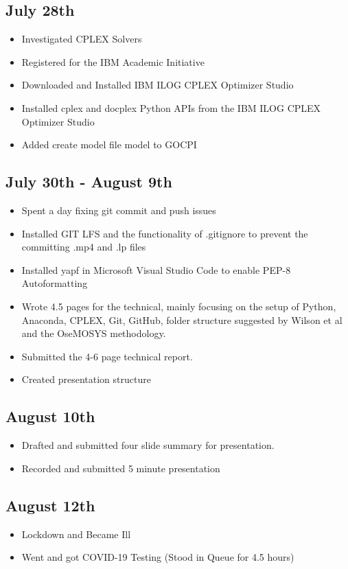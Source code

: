 \documentclass[12pt]{article}
\begin{document}
\subsection*{July 28th}
\begin{itemize}
	\item Investigated CPLEX Solvers
	\item Registered for the IBM Academic Initiative
	\item Downloaded and Installed IBM ILOG CPLEX Optimizer Studio
	\item Installed cplex and docplex Python APIs from the IBM ILOG CPLEX Optimizer Studio
	\item Added create model file model to GOCPI
\end{itemize}
\subsection*{July 30th - August 9th}
\begin{itemize}
	\item Spent a day fixing git commit and push issues
	\item Installed GIT LFS and the functionality of .gitignore to prevent the committing .mp4 and .lp files
	\item Installed yapf in Microsoft Visual Studio Code to enable PEP-8 Autoformatting
	\item Wrote 4.5 pages for the technical, mainly focusing on the setup of Python, Anaconda, CPLEX, Git, GitHub, folder structure suggested by Wilson et al and the OseMOSYS methodology.
	\item Submitted the 4-6 page technical report.
	\item Created presentation structure 
\end{itemize}
\subsection*{August 10th}
\begin{itemize}
	\item Drafted and submitted four slide summary for presentation.
	\item Recorded and submitted 5 minute presentation
\end{itemize}
\subsection*{August 12th}
\begin{itemize}
	\item Lockdown and Became Ill
	\item Went and got COVID-19 Testing (Stood in Queue for 4.5 hours)
\end{itemize}
\end{document}
